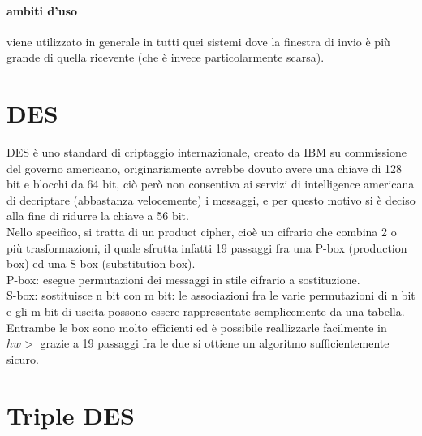 \documentclass{article}
\begin{document}
\paragraph{ambiti d'uso} viene utilizzato in generale in tutti quei sistemi dove
la finestra di invio è più grande di quella ricevente (che è invece
particolarmente scarsa).

\section{DES}
DES è uno standard di criptaggio internazionale, creato da IBM su commissione
del governo americano, originariamente avrebbe dovuto avere una chiave di 128
bit e blocchi da 64 bit, ciò però non consentiva ai servizi di intelligence
americana di decriptare (abbastanza velocemente) i messaggi, e per questo motivo
si è deciso alla fine di ridurre la chiave a 56 bit.\\
Nello specifico, si tratta di un product cipher, cioè un cifrario che combina 2
o più trasformazioni, il quale sfrutta infatti 19 passaggi fra una P-box
(production box) ed una S-box (substitution box).\\
P-box: esegue permutazioni dei messaggi in stile cifrario a sostituzione.\\
S-box: sostituisce n bit con m bit: le associazioni fra le varie permutazioni di
n bit e gli m bit di uscita possono essere rappresentate semplicemente da una
tabella.\\
Entrambe le box sono molto efficienti ed è possibile reallizzarle facilmente in
$hw>$ grazie a 19 passaggi fra le due si ottiene un algoritmo sufficientemente
sicuro.\\

\section{Triple DES}
\end{document}
